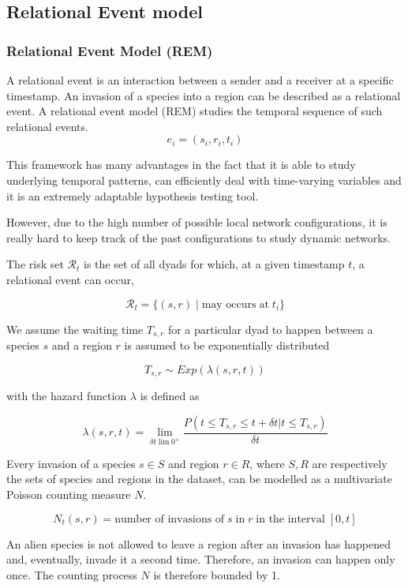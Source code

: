 \documentclass[
	11pt, %
]{beamer}
\begin{document}
\subsection{Relational Event model}
\begin{frame}
	\frametitle{Relational Event Model (REM)}
	
%	
	
	A relational event is an interaction between a sender and a receiver at a specific timestamp. An invasion of a species into a region can be described as a relational event. A relational event model (REM) studies the temporal sequence of such relational events.
\[
e_i = (s_i, r_i, t_i)
\]	
	
	This framework has many advantages in the fact that it is able to study underlying temporal patterns, can efficiently deal with time-varying variables and it is an extremely adaptable hypothesis testing tool.
	
However, due to the high number of possible local network configurations, it is really hard to keep track of the past configurations to study dynamic networks.
\end{frame}

\begin{frame}
The risk set $\mathcal{R}_t$ is the set of all dyads for which, at a given timestamp $t$, a relational event can occur,

\[
\mathcal{R}_{t} = \{(s,r) \; | \; \textrm{may occurs} \; \textrm{at} \; t_i\}
\]

We assume the waiting time $T_{s,r}$ for a particular dyad to happen between a species $s$ and a region $r$ is assumed to be exponentially distributed 

\[
T_{s,r} \sim Exp(\lambda(s, r, t) )
\]

with the hazard function $\lambda$ is defined as

\[
\lambda(s, r, t) = \lim_{\delta t \lim 0^+} \frac{P(t \leq T_{s,r} \leq t + \delta t | t \leq T_{s,r})}{\delta t}
\]
\end{frame}

\begin{frame}
Every invasion of a species $s \in S$ and region $r \in R$, where $S, R$ are respectively the sets of species and regions in the dataset, can be modelled as a multivariate Poisson counting measure  $N$.

\[
N_t(s, r) = \textrm{number of invasions of} \; s \; \textrm{in} \; r \; \textrm{in the interval} \; [0, t]
\]

An alien species is not allowed to leave a region after an invasion has happened and, eventually, invade it a second time. Therefore, an invasion can happen only once. The counting process $N$ is therefore bounded by 1.
\end{frame}
\end{document}
